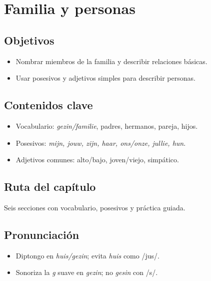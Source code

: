 \chapter{Familia y personas}
\section{Objetivos}
\begin{itemize}[leftmargin=*]
	\item Nombrar miembros de la familia y describir relaciones básicas.
	\item Usar posesivos y adjetivos simples para describir personas.
\end{itemize}

\section{Contenidos clave}
\begin{itemize}[leftmargin=*]
	\item Vocabulario: \textit{gezin/familie}, padres, hermanos, pareja, hijos.
	\item Posesivos: \textit{mijn, jouw, zijn, haar, ons/onze, jullie, hun}.
	\item Adjetivos comunes: alto/bajo, joven/viejo, simpático.
\end{itemize}

\section{Ruta del capítulo}
Seis secciones con vocabulario, posesivos y práctica guiada.








\section{Pronunciación}
\begin{itemize}[leftmargin=*]
	\item Diptongo en \textit{huis/gezin}; evita \textit{huis} como /jus/.
	\item Sonoriza la \textit{g} suave en \textit{gezin}; no \textit{gesin} con /s/.
\end{itemize}

